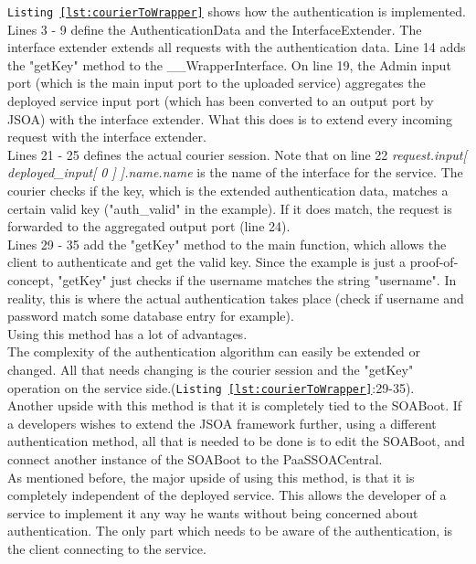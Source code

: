 \documentclass[12pt,a4paper]{article}
\begin{document}
\texttt{Listing \ref{lst:courierToWrapper}} shows how the authentication is implemented. Lines 3 - 9 define the AuthenticationData and the InterfaceExtender. The interface extender extends all requests with the authentication data. Line 14 adds the "getKey" method to the \_\_WrapperInterface. On line 19, the Admin input port (which is the main input port to the uploaded service) aggregates the deployed service input port (which has been converted to an output port by JSOA) with the interface extender. What this does is to extend every incoming request with the interface extender.\\
Lines 21 - 25 defines the actual courier session. Note that on line 22 \emph{request.input[
deployed\_input[ 0 ] ].name.name} is the name of the interface for the service. The courier checks if the key, which is the extended authentication data, matches a certain valid key ("auth\_valid" in the example). If it does match, the request is forwarded to the aggregated output port (line 24).\\
Lines 29 - 35 add the "getKey" method to the main function, which allows the client to authenticate and get the valid key. Since the example is just a proof-of-concept, "getKey" just checks if the username matches the string "username". In reality, this is where the actual authentication takes place (check if username and password match some database entry for example).\\

Using this method has a lot of advantages.  \\
The complexity of the authentication algorithm can easily be extended or changed. All that needs changing is the courier session and the "getKey" operation on the service side.(\texttt{Listing \ref{lst:courierToWrapper}}:29-35).\\
Another upside with this method is that it is completely tied to the SOABoot. If a developers wishes to extend the JSOA framework further, using a different authentication method, all that is needed to be done is to edit the SOABoot, and connect another instance of the SOABoot to the PaaSSOACentral.\\
As mentioned before, the major upside of using this method, is that it is completely independent of the deployed service. This allows the developer of a service to implement it any way he wants without being concerned about authentication. The only part which needs to be aware of the authentication, is the client connecting to the service. \\
\end{document}
